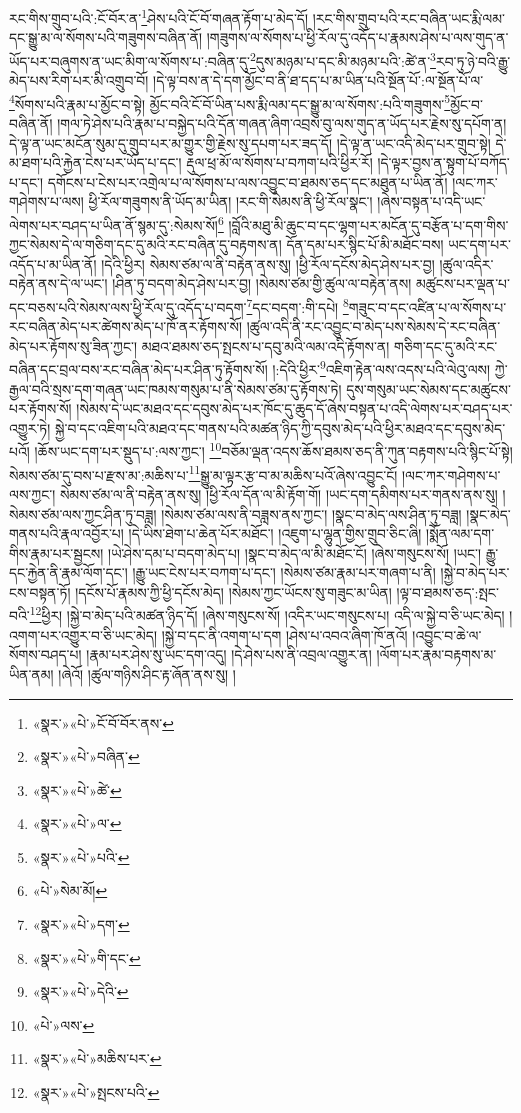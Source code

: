 རང་གིས་གྲུབ་པའི་:ངོ་བོར་ན་\footnote{«སྣར་»«པེ་»ངོ་བོ་བོར་ནས་}ཤེས་པའི་ངོ་བོ་གཞན་རྟོག་པ་མེད་དོ། །རང་གིས་གྲུབ་པའི་རང་བཞིན་ཡང་རྨི་ལམ་དང་སྒྱུ་མ་ལ་སོགས་པའི་གཟུགས་བཞིན་ནོ། །གཟུགས་ལ་སོགས་པ་ཕྱི་རོལ་དུ་འདོད་པ་རྣམས་ཤེས་པ་ལས་གུད་ན་ཡོད་པར་བཞུགས་ན་ཡང་མིག་ལ་སོགས་པ་:བཞིན་དུ་\footnote{«སྣར་»«པེ་»བཞིན་}དུས་མཉམ་པ་དང་མི་མཉམ་པའི་:ཚེ་ན་\footnote{«སྣར་»«པེ་»ཚེ་}རབ་ཏུ་ཉེ་བའི་རྒྱུ་མེད་པས་རིག་པར་མི་འགྲུབ་བོ། །དེ་ལྟ་བས་ན་དེ་དག་མྱོང་བ་ནི་ཐ་དད་པ་མ་ཡིན་པའི་སྔོན་པོ་:ལ་སྔོན་པོ་ལ་\footnote{«སྣར་»«པེ་»ལ་}སོགས་པའི་རྣམ་པ་མྱོང་བ་སྟེ། མྱོང་བའི་ངོ་བོ་ཡིན་པས་རྨི་ལམ་དང་སྒྱུ་མ་ལ་སོགས་:པའི་གཟུགས་\footnote{«སྣར་»«པེ་»པའི་}མྱོང་བ་བཞིན་ནོ། །གལ་ཏེ་ཤེས་པའི་རྣམ་པ་བསྐྱེད་པའི་དོན་གཞན་ཞིག་འབྲས་བུ་ལས་གུད་ན་ཡོད་པར་རྗེས་སུ་དཔོག་ན། དེ་ལྟ་ན་ཡང་མངོན་སུམ་དུ་གྲུབ་པར་མ་གྱུར་གྱི་རྗེས་སུ་དཔག་པར་ཟད་དོ། །དེ་ལྟ་ན་ཡང་འདི་མེད་པར་གྲུབ་སྟེ། དེ་མ་ཐག་པའི་རྐྱེན་ངེས་པར་ཡོད་པ་དང་། རྡུལ་ཕྲ་མོ་ལ་སོགས་པ་བཀག་པའི་ཕྱིར་རོ། །དེ་ལྟར་བྱས་ན་སྟུག་པོ་བཀོད་པ་དང་། དགོངས་པ་ངེས་པར་འགྲེལ་པ་ལ་སོགས་པ་ལས་འབྱུང་བ་ཐམས་ཅད་དང་མཐུན་པ་ཡིན་ནོ། །ལང་ཀར་གཤེགས་པ་ལས། ཕྱི་རོལ་གཟུགས་ནི་ཡོད་མ་ཡིན། །རང་གི་སེམས་ནི་ཕྱི་རོལ་སྣང་། །ཞེས་བསྟན་པ་འདི་ཡང་ལེགས་པར་བཤད་པ་ཡིན་ནོ་སྙམ་དུ་:སེམས་སོ།\footnote{«པེ་»སེམ་མོ།} །བློའི་མཐུ་མི་ཆུང་བ་དང་ལྷག་པར་མངོན་དུ་བརྩོན་པ་དག་གིས་ཀྱང་སེམས་དེ་ལ་གཅིག་དང་དུ་མའི་རང་བཞིན་དུ་བརྟགས་ན། དོན་དམ་པར་སྙིང་པོ་མི་མཐོང་བས། ཡང་དག་པར་འདོད་པ་མ་ཡིན་ནོ། །དེའི་ཕྱིར། སེམས་ཙམ་ལ་ནི་བརྟེན་ནས་སུ། །ཕྱི་རོལ་དངོས་མེད་ཤེས་པར་བྱ། །ཚུལ་འདིར་བརྟེན་ནས་དེ་ལ་ཡང་། །ཤིན་ཏུ་བདག་མེད་ཤེས་པར་བྱ། །སེམས་ཙམ་གྱི་ཚུལ་ལ་བརྟེན་ནས། མཚུངས་པར་ལྡན་པ་དང་བཅས་པའི་སེམས་ལས་ཕྱི་རོལ་དུ་འདོད་པ་བདག་\footnote{«སྣར་»«པེ་»དག་}དང་བདག་:གི་དཔེ། \footnote{«སྣར་»«པེ་»གི་དང་}གཟུང་བ་དང་འཛིན་པ་ལ་སོགས་པ་རང་བཞིན་མེད་པར་ཚེགས་མེད་པ་ཁོ་ནར་རྟོགས་སོ། །ཚུལ་འདི་ནི་རང་འབྱུང་བ་མེད་པས་སེམས་དེ་རང་བཞིན་མེད་པར་རྟོགས་སུ་ཟིན་ཀྱང་། མཐའ་ཐམས་ཅད་སྤངས་པ་དབུ་མའི་ལམ་འདི་རྟོགས་ན། གཅིག་དང་དུ་མའི་རང་བཞིན་དང་བྲལ་བས་རང་བཞིན་མེད་པར་ཤིན་ཏུ་རྟོགས་སོ། །:དེའི་ཕྱིར་\footnote{«སྣར་»«པེ་»དེའི་}འཇིག་རྟེན་ལས་འདས་པའི་ལེའུ་ལས། ཀྱེ་རྒྱལ་བའི་སྲས་དག་གཞན་ཡང་ཁམས་གསུམ་པ་ནི་སེམས་ཙམ་དུ་རྟོགས་ཏེ། དུས་གསུམ་ཡང་སེམས་དང་མཚུངས་པར་རྟོགས་སོ། །སེམས་དེ་ཡང་མཐའ་དང་དབུས་མེད་པར་ཁོང་དུ་ཆུད་དོ་ཞེས་བསྟན་པ་འདི་ལེགས་པར་བཤད་པར་འགྱུར་ཏེ། སྐྱེ་བ་དང་འཇིག་པའི་མཐའ་དང་གནས་པའི་མཚན་ཉིད་ཀྱི་དབུས་མེད་པའི་ཕྱིར་མཐའ་དང་དབུས་མེད་པའོ། །ཆོས་ཡང་དག་པར་སྡུད་པ་:ལས་ཀྱང་། \footnote{«པེ་»ལས་}བཅོམ་ལྡན་འདས་ཆོས་ཐམས་ཅད་ནི་ཀུན་བརྟགས་པའི་སྙིང་པོ་སྟེ། སེམས་ཙམ་དུ་བས་པ་རྫས་མ་:མཆིས་པ་\footnote{«སྣར་»«པེ་»མཆིས་པར་}སྒྱུ་མ་ལྟར་རྩ་བ་མ་མཆིས་པའོ་ཞེས་འབྱུང་ངོ། །ལང་ཀར་གཤེགས་པ་ལས་ཀྱང་། སེམས་ཙམ་ལ་ནི་བརྟེན་ནས་སུ། །ཕྱི་རོལ་དོན་ལ་མི་རྟོག་གོ། །ཡང་དག་དམིགས་པར་གནས་ནས་སུ། །སེམས་ཙམ་ལས་ཀྱང་ཤིན་ཏུ་བཟླ། །སེམས་ཙམ་ལས་ནི་བཟླས་ནས་ཀྱང་། །སྣང་བ་མེད་ལས་ཤིན་ཏུ་བཟླ། །སྣང་མེད་གནས་པའི་རྣལ་འབྱོར་པ། །དེ་ཡིས་ཐེག་པ་ཆེན་པོར་མཐོང་། །འཇུག་པ་ལྷུན་གྱིས་གྲུབ་ཅིང་ཞི། །སྨོན་ལམ་དག་གིས་རྣམ་པར་སྦྱངས། །ཡེ་ཤེས་དམ་པ་བདག་མེད་པ། །སྣང་བ་མེད་ལ་མི་མཐོང་ངོ། །ཞེས་གསུངས་སོ། །ཡང་། རྒྱུ་དང་རྐྱེན་ནི་རྣམ་ལོག་དང་། །རྒྱུ་ཡང་ངེས་པར་བཀག་པ་དང་། །སེམས་ཙམ་རྣམ་པར་གཞག་པ་ནི། །སྐྱེ་བ་མེད་པར་ངས་བསྟན་ཏོ། །དངོས་པོ་རྣམས་ཀྱི་ཕྱི་དངོས་མེད། །སེམས་ཀྱང་ཡོངས་སུ་གཟུང་མ་ཡིན། །ལྟ་བ་ཐམས་ཅད་:སྤང་བའི་\footnote{«སྣར་»«པེ་»སྤངས་པའི་}ཕྱིར། །སྐྱེ་བ་མེད་པའི་མཚན་ཉིད་དོ། །ཞེས་གསུངས་སོ། །འདིར་ཡང་གསུངས་པ། འདི་ལ་སྐྱེ་བ་ཅི་ཡང་མེད། །འགག་པར་འགྱུར་བ་ཅི་ཡང་མེད། །སྐྱེ་བ་དང་ནི་འགག་པ་དག །ཤེས་པ་འབའ་ཞིག་ཁོ་ནའོ། །འབྱུང་བ་ཆེ་ལ་སོགས་བཤད་པ། །རྣམ་པར་ཤེས་སུ་ཡང་དག་འདུ། །དེ་ཤེས་པས་ནི་འབྲལ་འགྱུར་ན། །ལོག་པར་རྣམ་བརྟགས་མ་ཡིན་ནམ། །ཞེའོ། །ཚུལ་གཉིས་ཤིང་རྟ་ཞོན་ནས་སུ། །

